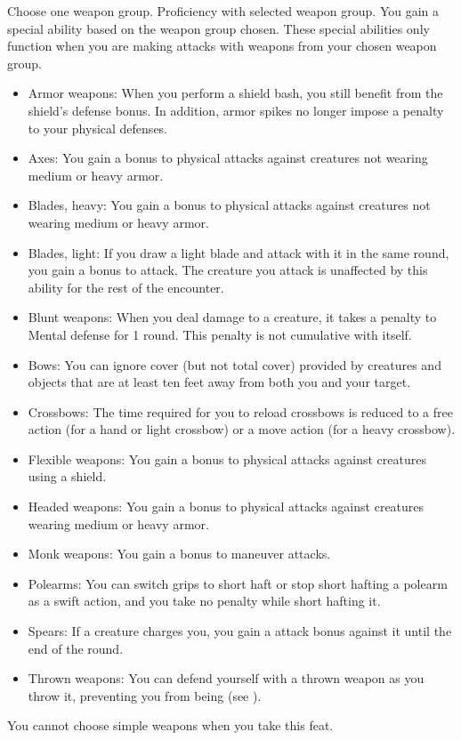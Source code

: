 Choose one weapon group.
\featpres
Proficiency with selected weapon group.
\featben You gain a special ability based on the weapon group chosen.
These special abilities only function when you are making attacks with weapons from your chosen weapon group.
\begin{itemize}
    \item Armor weapons: When you perform a shield bash, you still benefit from the shield's defense bonus.
        In addition, armor spikes no longer impose a penalty to your physical defenses.
    \item Axes: You gain a  bonus to physical attacks against creatures not wearing medium or heavy armor.
    \item Blades, heavy: You gain a  bonus to physical attacks against creatures not wearing medium or heavy armor.
    \item Blades, light: If you draw a light blade and attack with it in the same round, you gain a  bonus to attack.
        The creature you attack is unaffected by this ability for the rest of the encounter.
    \item Blunt weapons: When you deal damage to a creature, it takes a  penalty to Mental defense for 1 round.
        This penalty is not cumulative with itself.
    \item Bows: You can ignore cover (but not total cover) provided by creatures and objects that are at least ten feet away from both you and your target.
    \item Crossbows: The time required for you to reload crossbows is reduced to a free action (for a hand or light crossbow) or a move action (for a heavy crossbow).
    \item Flexible weapons: You gain a  bonus to physical attacks against creatures using a shield.
    \item Headed weapons: You gain a  bonus to physical attacks against creatures wearing medium or heavy armor.
    \item Monk weapons: You gain a  bonus to maneuver attacks.
    \item Polearms: You can switch grips to short haft or stop short hafting a polearm as a swift action, and you take no penalty while short hafting it.
    \item Spears: If a creature charges you, you gain a  attack bonus against it until the end of the round.
    \item Thrown weapons: You can defend yourself with a thrown weapon as you throw it, preventing you from being  (see ).
\end{itemize}
You cannot choose simple weapons when you take this feat.

